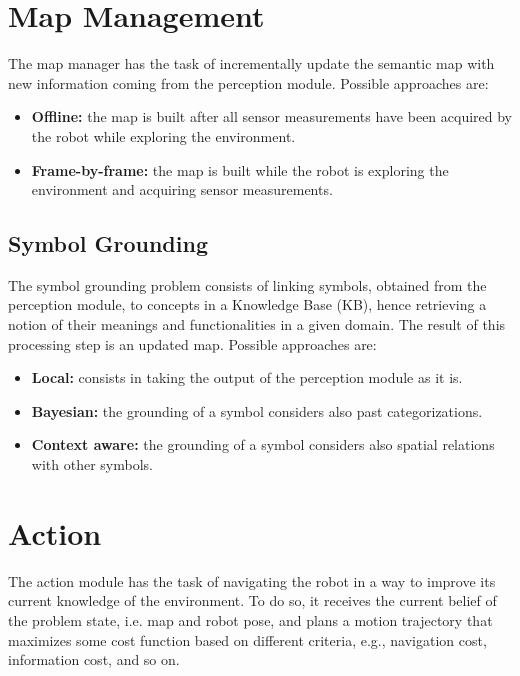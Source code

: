 \documentclass{article}
\begin{document}
	
	\section{Map Management}
	
	The map manager has the task of incrementally update the semantic map with new information coming from the perception module. Possible approaches are:
		
	\begin{itemize}
		\item {\bf Offline:} the map is built after all sensor measurements have been acquired by the robot while exploring the environment.
		\item {\bf Frame-by-frame:} the map is built while the robot is exploring the environment and acquiring sensor measurements.
	\end{itemize}
	
	\subsection{Symbol Grounding}
	
	The symbol grounding problem consists of linking symbols, obtained from the perception module, to concepts in a Knowledge Base (KB), hence retrieving a notion	of their meanings and functionalities in a given domain. The result of this processing step is an updated map. Possible approaches are:
	
	\begin{itemize}
		\item {\bf Local:} consists in taking the output of the perception module as it is.
		\item {\bf Bayesian:} the grounding of a symbol considers also past categorizations.
		\item {\bf Context aware:} the grounding of a symbol considers also spatial relations with other symbols.
	\end{itemize}
	
	\section{Action}
	
	The action module has the task of navigating the robot in a way to improve its current knowledge of the environment. To do so, it receives the current belief of the problem state, i.e. map and robot pose, and plans a motion trajectory that maximizes some cost function based on different criteria, e.g., navigation cost, information cost, and so on.
	
\end{document}
